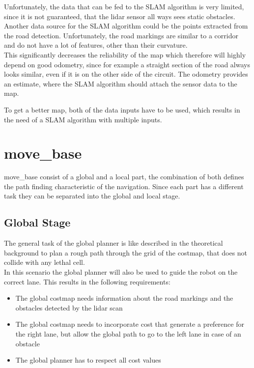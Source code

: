 Unfortunately, the data that can be fed to the SLAM algorithm is very limited, since it is not guaranteed, that the lidar sensor all ways sees static obstacles. Another data source for the SLAM algorithm could be the points extracted from the road detection. Unfortunately, the road markings are similar to a corridor and do not have a lot of features, other than their curvature.\\

This significantly decreases the reliability of the map which therefore will highly depend on good odometry, since for example a straight section of the road always looks similar, even if it is on the other side of the circuit. The odometry provides an estimate, where the SLAM algorithm should attach the sensor data to the map.

To get a better map, both of the data inputs have to be used, which results in the need of a SLAM algorithm with multiple inputs.\\

\section{move\_base}

move\_base consist of a global and a local part, the combination of both defines the path finding characteristic of the navigation. Since each part has a different task they can be separated into the global and local stage.

\subsection{Global Stage}
The general task of the global planner is like described in the theoretical background to plan a rough path through the grid of the costmap, that does not collide with any lethal cell.\\

In this scenario the global planner will also be used to guide the robot on the correct lane. This results in the following requirements:

\begin{itemize}
	\item The global costmap needs information about the road markings and the obstacles detected by the lidar scan
	\item The global costmap needs to incorporate cost that generate a preference for the right lane, but allow the global path to go to the left lane in case of an obstacle
	\item The global planner has to respect all cost values
\end{itemize}

